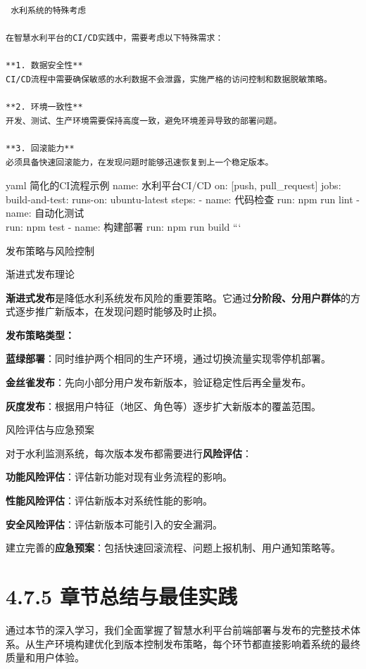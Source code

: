 {{\begin{lstlisting}
 水利系统的特殊考虑

在智慧水利平台的CI/CD实践中，需要考虑以下特殊需求：

**1. 数据安全性**
CI/CD流程中需要确保敏感的水利数据不会泄露，实施严格的访问控制和数据脱敏策略。

**2. 环境一致性**
开发、测试、生产环境需要保持高度一致，避免环境差异导致的部署问题。

**3. 回滚能力**
必须具备快速回滚能力，在发现问题时能够迅速恢复到上一个稳定版本。
\end{lstlisting}

yaml  简化的CI流程示例 name: 水利平台CI/CD on: {[}push, pull\_request{]} jobs: build-and-test: runs-on: ubuntu-latest steps: - name: 代码检查 run: npm run lint - name: 自动化测试\\
run: npm test - name: 构建部署 run: npm run build ```

 发布策略与风险控制

 渐进式发布理论

\textbf{渐进式发布}是降低水利系统发布风险的重要策略。它通过\textbf{分阶段、分用户群体}的方式逐步推广新版本，在发现问题时能够及时止损。

\textbf{发布策略类型：}

\textbf{蓝绿部署}：同时维护两个相同的生产环境，通过切换流量实现零停机部署。

\textbf{金丝雀发布}：先向小部分用户发布新版本，验证稳定性后再全量发布。

\textbf{灰度发布}：根据用户特征（地区、角色等）逐步扩大新版本的覆盖范围。

 风险评估与应急预案

对于水利监测系统，每次版本发布都需要进行\textbf{风险评估}：

\textbf{功能风险评估}：评估新功能对现有业务流程的影响。

\textbf{性能风险评估}：评估新版本对系统性能的影响。

\textbf{安全风险评估}：评估新版本可能引入的安全漏洞。

建立完善的\textbf{应急预案}：包括快速回滚流程、问题上报机制、用户通知策略等。

\section{4.7.5 章节总结与最佳实践}

通过本节的深入学习，我们全面掌握了智慧水利平台前端部署与发布的完整技术体系。从生产环境构建优化到版本控制发布策略，每个环节都直接影响着系统的最终质量和用户体验。

}}

